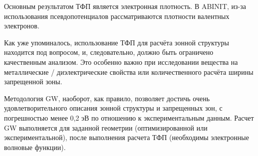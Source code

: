 Основным результатом ТФП является электронная плотность. В ABINIT, из-за использования псевдопотенциалов рассматриваются плотности валентных электронов. 

Как уже упоминалось, использование ТФП для расчёта зонной структуры находится под вопросом, и, следовательно, должно быть ограничено качественным анализом. Это особенно важно при исследовании вещества на металлические / диэлектрические свойства или количественного расчёта ширины запрещенной зоны.

Методология GW, наоборот, как правило, позволяет достичь очень удовлетворительного описания зонной структуры и запрещенных зон, с погрешностью менее 0,2 эВ по отношению к экспериментальным данным. Расчет GW выполняется для заданной геометрии (оптимизированной или экспериментальной), после выполнения расчета ТФП (необходимы электронные волновые функции).\cite{abinit}
